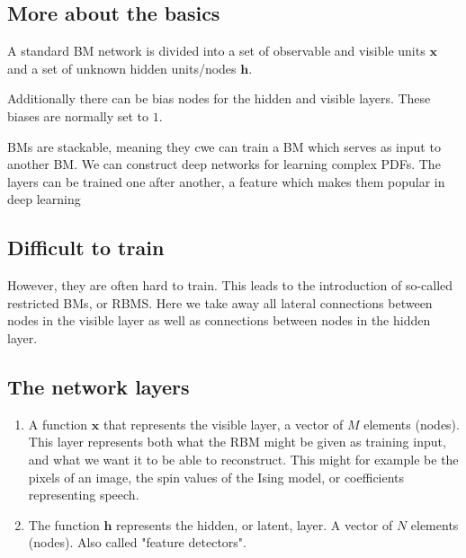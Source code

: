 \documentclass[%
oneside,                 %
final,                   %
10pt]{article}
\begin{document}
\subsection{More about the basics}
\begin{block}{}
A standard BM network is divided into a set of observable and visible units $\bm{x}$ and a set of unknown hidden units/nodes $\bm{h}$.
\end{block}

\begin{block}{}
Additionally there can be bias nodes for the hidden and visible layers. These biases are normally set to $1$.
\end{block}

\begin{block}{}
BMs are stackable, meaning they cwe can train a BM which serves as input to another BM. We can construct deep networks for learning complex PDFs. The layers can be trained one after another, a feature which makes them popular in deep learning
\end{block}

\subsection{Difficult to train}

However, they are often hard to train. This leads to the introduction
of so-called restricted BMs, or RBMS.  Here we take away all lateral
connections between nodes in the visible layer as well as connections
between nodes in the hidden layer.

\subsection{The network layers}

\begin{enumerate}
\item A function $\bm{x}$ that represents the visible layer, a vector of $M$ elements (nodes). This layer represents both what the RBM might be given as training input, and what we want it to be able to reconstruct. This might for example be the pixels of an image, the spin values of the Ising model, or coefficients representing speech.

\item The function $\bm{h}$ represents the hidden, or latent, layer. A vector of $N$ elements (nodes). Also called "feature detectors".
\end{enumerate}
\end{document}
